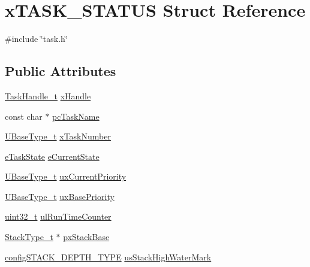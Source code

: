 \hypertarget{structxTASK__STATUS}{}\section{x\+T\+A\+S\+K\+\_\+\+S\+T\+A\+T\+US Struct Reference}
\label{structxTASK__STATUS}


{\ttfamily \#include \char`\"{}task.\+h\char`\"{}}

\subsection*{Public Attributes}
\begin{DoxyCompactItemize}
\item 
\hyperlink{task_8h_a25b35e6e19ecf894173e7ff95edb96ef}{Task\+Handle\+\_\+t} \hyperlink{structxTASK__STATUS_ac57f825f365c3c64bba827285fe3c2a0}{x\+Handle}
\item 
const char $\ast$ \hyperlink{structxTASK__STATUS_ad272663e2560bd9ea088384a39ba6192}{pc\+Task\+Name}
\item 
\hyperlink{pic32mx_2portmacro_8h_a646f89d4298e4f5afd522202b11cb2e6}{U\+Base\+Type\+\_\+t} \hyperlink{structxTASK__STATUS_acd44468ba37270b04f83d0833c098057}{x\+Task\+Number}
\item 
\hyperlink{task_8h_a1749369458e2282a22e862a619a3892c}{e\+Task\+State} \hyperlink{structxTASK__STATUS_a727e904e3afe49472b0fc6a4e96439cb}{e\+Current\+State}
\item 
\hyperlink{pic32mx_2portmacro_8h_a646f89d4298e4f5afd522202b11cb2e6}{U\+Base\+Type\+\_\+t} \hyperlink{structxTASK__STATUS_a39df647234fc0d6de5852042a2741a94}{ux\+Current\+Priority}
\item 
\hyperlink{pic32mx_2portmacro_8h_a646f89d4298e4f5afd522202b11cb2e6}{U\+Base\+Type\+\_\+t} \hyperlink{structxTASK__STATUS_a692f4c8957b7270f1579cdee63ff287e}{ux\+Base\+Priority}
\item 
\hyperlink{stdint_8h_a435d1572bf3f880d55459d9805097f62}{uint32\+\_\+t} \hyperlink{structxTASK__STATUS_a92ab83f4f376c255dedf8e06a78261f7}{ul\+Run\+Time\+Counter}
\item 
\hyperlink{pic32mx_2portmacro_8h_a84e9a8ba132feed0b2401c1f4e2ac63c}{Stack\+Type\+\_\+t} $\ast$ \hyperlink{structxTASK__STATUS_a0ee59674d2cc57d3a5a29c777d5452ed}{px\+Stack\+Base}
\item 
\hyperlink{FreeRTOS_8h_ae4e85bffd36d76cf2796092f0ccd784a}{config\+S\+T\+A\+C\+K\+\_\+\+D\+E\+P\+T\+H\+\_\+\+T\+Y\+PE} \hyperlink{structxTASK__STATUS_aaad57afd4a629d2404e1cff97891c571}{us\+Stack\+High\+Water\+Mark}
\end{DoxyCompactItemize}


